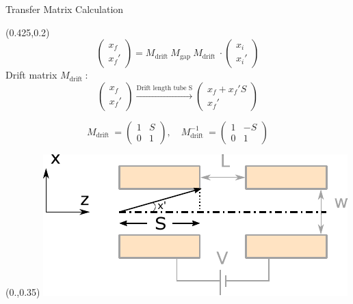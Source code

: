 \documentclass[10pt,aspectratio=169]{beamer}
\begin{document}
\begin{frame}{Transfer Matrix Calculation}
    \begin{textblock*}{0.5\paperwidth}(0.425\paperwidth,0.2\paperheight)
        \centering
        \begin{equation*}
            \begin{pmatrix}x_f \\ x_f'\end{pmatrix} = M_\text{drift  } M_\text{gap  } M_\text{drift  } \cdot \begin{pmatrix}x_i \\ x_i'\end{pmatrix}
        \end{equation*}
        Drift matrix $M_\text{drift  }$: 
        \begin{equation*}
            \begin{pmatrix}x_f \\ x_f'\end{pmatrix} \xrightarrow{\text{Drift length tube S}} \begin{pmatrix} x_f + x_f' S \\ x_f'\end{pmatrix}
        \end{equation*}

        \begin{equation*}
            M_\text{drift  } = \begin{pmatrix} 1 & S \\ 0 & 1 \end{pmatrix}, \quad  M_\text{drift  }^{-1} = \begin{pmatrix} 1 & -S \\ 0 & 1 \end{pmatrix}
        \end{equation*}

            
    \end{textblock*}
    \begin{textblock*}{0.5\paperwidth}(0.\paperwidth,0.35\paperheight)
		\centering
		\includegraphics[width=.8\textwidth]{Exercises_presentation/images/ibs_logo_2.pdf}
	\end{textblock*}

\end{frame}
\end{document}
